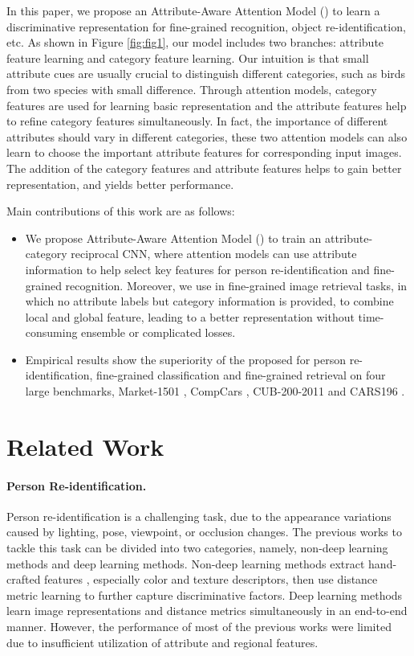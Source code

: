 \documentclass[sigconf]{acmart}
\begin{document}
In this paper, we propose an Attribute-Aware Attention Model () to learn a discriminative representation for fine-grained recognition, object re-identification, etc. As shown in Figure \ref{fig:fig1}, our model includes two branches: attribute feature learning and category feature learning. Our intuition is that small attribute cues are usually crucial to distinguish different categories, such as birds from two species with small difference. Through attention models, category features are used for learning basic representation and the attribute features help to refine category features simultaneously. In fact, the importance of different attributes should vary in different categories, these two attention models can also learn to choose the important attribute features for corresponding input images. The addition of the category features and attribute features helps to gain better representation, and yields better performance.

Main contributions of this work are as follows:
\begin{itemize}
\item We propose Attribute-Aware Attention Model () to train an attribute-category reciprocal CNN, where attention models can use attribute information to help select key features for person re-identification and fine-grained recognition. Moreover, we use  in fine-grained image retrieval tasks, in which no attribute labels but category information is provided, to combine local and global feature, leading to a better representation without time-consuming ensemble or complicated losses.
\item Empirical results show the superiority of the proposed  for person re-identification, fine-grained classification and fine-grained retrieval on four large benchmarks, Market-1501 \cite{Zheng2015Scalable}, CompCars \cite{yang2015large}, CUB-200-2011 \cite{wah2011caltech} and CARS196 \cite{cars196}.
\end{itemize}

\section{Related Work}
\paragraph{Person Re-identification.} Person re-identification is a challenging task, due to the appearance variations caused by lighting, pose, viewpoint, or occlusion changes. The previous works to tackle this task can be divided into two categories, namely, non-deep learning methods and deep learning methods. Non-deep learning methods extract hand-crafted features \cite{zhao2013person,liao2015person}, especially color and texture descriptors, then use distance metric learning \cite{koestinger2012large, liao2015person} to further capture discriminative factors. Deep learning methods \cite{yi2014deep,ahmed2015improved,varior2016siamese} learn image representations and distance metrics simultaneously in an end-to-end manner. However, the performance of most of the previous works were limited due to insufficient utilization of attribute and regional features.
\end{document}
